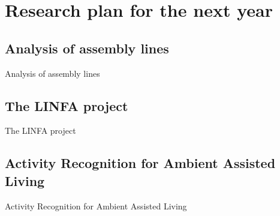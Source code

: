 
\section{Research plan for the next year}
  \subsection{Analysis of assembly lines}
    \begin{frame}{Analysis of assembly lines}
      
    \end{frame}
    
  \subsection{The LINFA project}
    \begin{frame}{The LINFA project}
      
    \end{frame}
    
  \subsection{Activity Recognition for Ambient Assisted Living}
    \begin{frame}{Activity Recognition for Ambient Assisted Living}
      
    \end{frame}